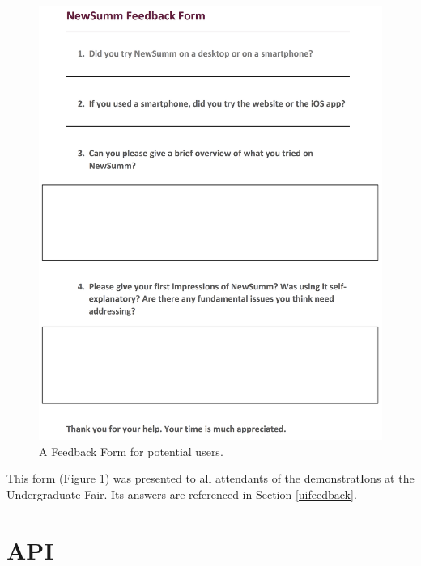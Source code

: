 \documentclass[12pt]{article}
\begin{document}
\begin{appendices}
\label{uif}

\begin{figure}[p]
  \centering
    \includegraphics[scale=0.8]{NewSummFeedback.png}
   \caption[A wireframe of the Topic Settings page]{A Feedback Form for potential users.}
   \label{feedbackform}
\end{figure}

This form (Figure \ref{feedbackform}) was presented to all attendants of the demonstratIons at the Undergraduate Fair. Its answers are referenced in Section \ref{uifeedback}.




\pagebreak

\section{API}

\label{WebAPI}


\end{appendices}
\end{document}

